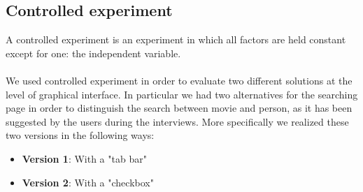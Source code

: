 \documentclass[12pt, a4paper]{article}
\numberwithin{figure}{section}
\begin{document}
\subsection{Controlled experiment}

A controlled experiment is an experiment in which all factors are held constant except for one: 
the independent variable.\\\\
We used  controlled experiment in order to evaluate two different solutions at the level of graphical interface. 
In particular we had two alternatives for the searching page in order to distinguish the search between
movie and person, as it has been suggested by the users during the interviews.
More specifically we realized these two versions in the following ways:
\begin{itemize}
	\item \textbf{Version 1}: With a "tab bar" 
	\item \textbf{Version 2}: With a "checkbox"
\end{itemize}
\end{document}
